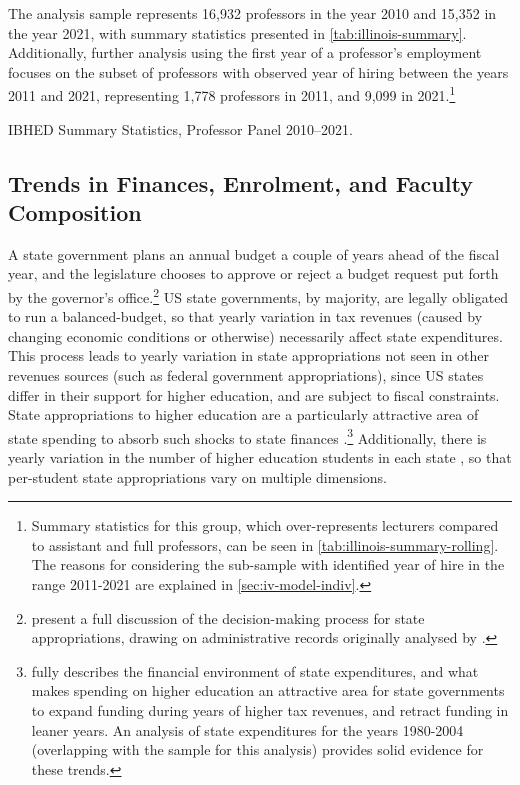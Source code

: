 The analysis sample represents 16,932 professors in the year 2010 and 15,352 in the year 2021, with summary statistics presented in \autoref{tab:illinois-summary}.
Additionally, further analysis using the first year of a professor's employment focuses on the subset of professors with observed year of hiring between the years 2011 and 2021, representing 1,778 professors in 2011, and 9,099 in 2021.\footnote{
    Summary statistics for this group, which over-represents lecturers compared to assistant and full professors, can be seen in \autoref{tab:illinois-summary-rolling}.
    The reasons for considering the sub-sample with identified year of hire in the range 2011-2021 are explained in \autoref{sec:iv-model-indiv}.
}

\begin{table}[h!]
    \singlespacing
    \centering
    \caption{IBHED Summary Statistics, Professor Panel 2010--2021.}
    \makebox[\textwidth][c]{}
    \label{tab:illinois-summary}
\end{table}

\subsection{Trends in Finances, Enrolment, and Faculty Composition}
\label{sec:trends}
A state government plans an annual budget a couple of years ahead of the fiscal year, and the legislature chooses to approve or reject a budget request put forth by the governor's office.\footnote{
    \cite{NBERw23736} present a full discussion of the decision-making process for state appropriations, drawing on administrative records originally analysed by \cite{parmley2009state}.
}
US state governments, by majority, are legally obligated to run a balanced-budget, so that yearly variation in tax revenues (caused by changing economic conditions or otherwise) necessarily affect state expenditures.
This process leads to yearly variation in state appropriations not seen in other revenues sources (such as federal government appropriations), since US states differ in their support for higher education, and are subject to fiscal constraints.
State appropriations to higher education are a particularly attractive area of state spending to absorb such shocks to state finances \citep{delaney2011state}.\footnote{
    \cite{delaney2011state} fully describes the financial environment of state expenditures, and what makes spending on higher education an attractive area for state governments to expand funding during years of higher tax revenues, and retract funding in leaner years.
    An analysis of state expenditures for the years 1980-2004 (overlapping with the sample for this analysis) provides solid evidence for these trends.
}
Additionally, there is yearly variation in the number of higher education students in each state \citep{turner2014impact}, so that per-student state appropriations vary on multiple dimensions.

